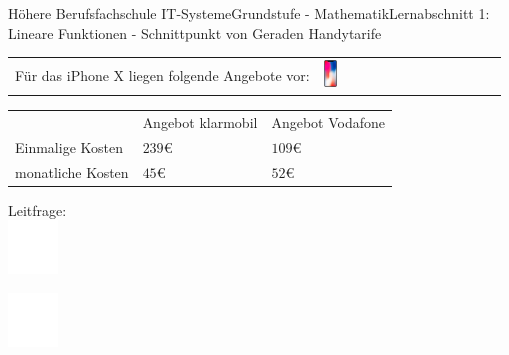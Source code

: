 \documentclass[oneside,openany,headings=optiontotoc,11pt,numbers=noenddot]{scrreprt}
\begin{document}
	\begin{worksheet}{Höhere Berufsfachschule IT-Systeme}{Grundstufe - Mathematik}{Lernabschnitt 1: Lineare Funktionen - Schnittpunkt von Geraden}
		\noindent
		\LARGE Handytarife\\
		\normalsize
		\noindent
		\begin{tabularx}{\textwidth}{Xl}
			\noindent
			Für das iPhone X liegen folgende Angebote vor: & \multirow{4}{*}{\includegraphics[width=0.08\textwidth]{../99_Bilder/iphox.png}}
		\end{tabularx}
		\begin{tabularx}{\textwidth}{|l|l|l|}
			\cline{1-3}
			& Angebot klarmobil & Angebot Vodafone\\
			\cline{1-3}
			Einmalige Kosten & \(239\)\euro{} & \(109\)\euro{}\\
			\cline{1-3}
			monatliche Kosten & \(45\)\euro{} & \(52\)\euro{}\\
			\cline{1-3}
		\end{tabularx}
		\begin{framed}
			\noindent
			\small{\color{codegray}Leitfrage:}\\
			\includegraphics[width=0.1\textwidth]{../../empty.jpg}\\
		\end{framed}
		\includegraphics[width=0.1\textwidth]{../../empty.jpg}\\
		\hspace*{-2cm}
		\begin{tabularx}{1.25\textwidth}{X|L{3cm}|}

\end{tabularx}
\end{worksheet}
\end{document}
